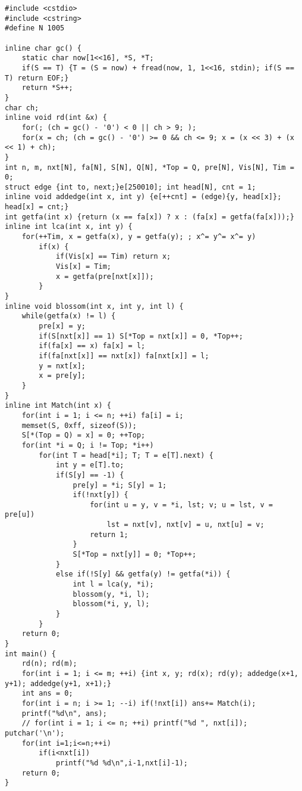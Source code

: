 \begin{verbatim}
#include <cstdio>
#include <cstring>
#define N 1005

inline char gc() {
	static char now[1<<16], *S, *T;
	if(S == T) {T = (S = now) + fread(now, 1, 1<<16, stdin); if(S == T) return EOF;}
	return *S++;
}
char ch;
inline void rd(int &x) {
	for(; (ch = gc() - '0') < 0 || ch > 9; );
	for(x = ch; (ch = gc() - '0') >= 0 && ch <= 9; x = (x << 3) + (x << 1) + ch);
}
int n, m, nxt[N], fa[N], S[N], Q[N], *Top = Q, pre[N], Vis[N], Tim = 0;
struct edge {int to, next;}e[250010]; int head[N], cnt = 1;
inline void addedge(int x, int y) {e[++cnt] = (edge){y, head[x]}; head[x] = cnt;}
int getfa(int x) {return (x == fa[x]) ? x : (fa[x] = getfa(fa[x]));}
inline int lca(int x, int y) {
	for(++Tim, x = getfa(x), y = getfa(y); ; x^= y^= x^= y)
		if(x) {
			if(Vis[x] == Tim) return x;
			Vis[x] = Tim;
			x = getfa(pre[nxt[x]]);
		}
}
inline void blossom(int x, int y, int l) {
	while(getfa(x) != l) {
		pre[x] = y;
		if(S[nxt[x]] == 1) S[*Top = nxt[x]] = 0, *Top++;
		if(fa[x] == x) fa[x] = l;
		if(fa[nxt[x]] == nxt[x]) fa[nxt[x]] = l;
		y = nxt[x];
		x = pre[y];
	}
}
inline int Match(int x) {
	for(int i = 1; i <= n; ++i) fa[i] = i;
	memset(S, 0xff, sizeof(S));
	S[*(Top = Q) = x] = 0; ++Top;
	for(int *i = Q; i != Top; *i++)
		for(int T = head[*i]; T; T = e[T].next) {
			int y = e[T].to;
			if(S[y] == -1) {
				pre[y] = *i; S[y] = 1;
				if(!nxt[y]) {
					for(int u = y, v = *i, lst; v; u = lst, v = pre[u])
						lst = nxt[v], nxt[v] = u, nxt[u] = v;
					return 1;
				}
				S[*Top = nxt[y]] = 0; *Top++;
			}
			else if(!S[y] && getfa(y) != getfa(*i)) {
				int l = lca(y, *i);
				blossom(y, *i, l);
				blossom(*i, y, l);
			}
		}
	return 0;
}
int main() {
	rd(n); rd(m);
	for(int i = 1; i <= m; ++i) {int x, y; rd(x); rd(y); addedge(x+1, y+1); addedge(y+1, x+1);}
	int ans = 0;
	for(int i = n; i >= 1; --i) if(!nxt[i]) ans+= Match(i);
	printf("%d\n", ans);
	// for(int i = 1; i <= n; ++i) printf("%d ", nxt[i]); putchar('\n');
    for(int i=1;i<=n;++i)
        if(i<nxt[i])
            printf("%d %d\n",i-1,nxt[i]-1);
	return 0;
}
\end{verbatim}

